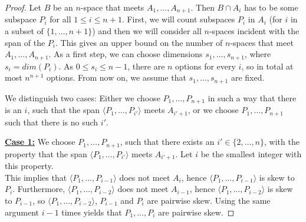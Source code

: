 \documentclass[11pt, oneside, a4paper]{article}
\begin{document}
\begin{proof}
     Let $B$ be an $n$-space that meets $A_1,\ldots,A_{n+1}$. 
     Then $B\cap A_i$ has to be some subspace $P_i$ for all $1\leq i\leq n+1$.
First, we will count subspaces $P_i$ in $A_i$ (for $i$ in a subset of $\{1,\ldots,n+1\}$) and then we will consider all $n$-spaces incident with the span of the $P_i$. This gives an upper bound on the number of $n$-spaces that meet $A_1,\ldots,A_{n+1}$.
As a first step, we can choose dimensions $s_1,\ldots,s_{n+1}$, where $s_i=dim(P_i)$. As $0\leq s_i\leq n-1$, there are $n$ options for every $i$, so in total at most $n^{n+1}$ options. From now on, we assume that $s_1,\ldots,s_{n+1}$ are fixed.

We distinguish two cases: Either we choose $P_1,\ldots,P_{n+1}$ in such a way that there is an $i$, such that the span $\langle P_1,\ldots,P_{i'} \rangle$ meets $A_{i'+1}$, or we choose $P_1,\ldots,P_{n+1}$ such that there is no such $i'$.

\textbf{\underline{Case 1:}} We choose $P_1,\ldots,P_{n+1}$, such that there exists an $i'\in \{2,\ldots,n\}$, with the property that the span $\langle P_1,\ldots,P_{i'} \rangle$ meets $A_{i'+1}$. Let $i$ be the smallest integer with this property.\\

This implies that $\langle P_1,\ldots,P_{i-1} \rangle$ does not meet $A_i$, hence $\langle P_1,\ldots,P_{i-1} \rangle$ is skew to $P_i$. Furthermore, $\langle P_1,\ldots,P_{i-2} \rangle$ does not meet $A_{i-1}$, hence $\langle P_1,\ldots,P_{i-2} \rangle$ is skew to $P_{i-1}$, so $\langle P_1,\ldots,P_{i-2} \rangle$, $P_{i-1}$ and $P_i$ are pairwise skew. Using the same argument $i-1$ times yields that $P_1,\ldots,P_i$ are pairwise skew.


\end{proof}
\end{document}
